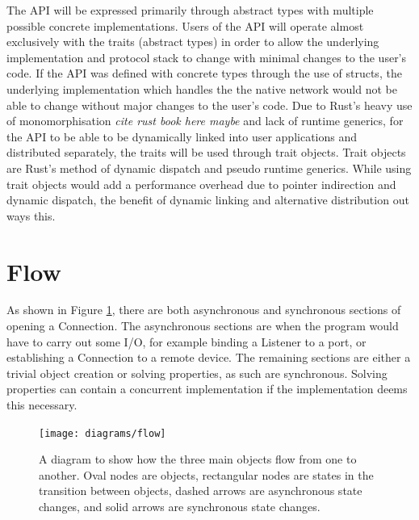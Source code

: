 \documentclass{l4proj}
\begin{document}
The API will be expressed primarily through abstract types with multiple possible concrete implementations.
Users of the API will operate almost exclusively with the traits (abstract types) in order to allow the underlying
implementation and protocol stack to change with minimal changes to the user's code.
If the API was defined with concrete types through the use of structs, the underlying implementation which handles the
the native network would not be able to change without major changes to the user's code.
Due to Rust's heavy use of monomorphisation \emph{cite rust book here maybe} and lack of runtime generics, for the API
to be able to be dynamically linked into user applications and distributed separately, the traits will be used through
trait objects.
Trait objects are Rust's method of dynamic dispatch and pseudo runtime generics.
While using trait objects would add a performance overhead due to pointer indirection and dynamic dispatch, the benefit
of dynamic linking and alternative distribution out ways this.

\section{Flow}
As shown in Figure \ref{fig:flow}, there are both asynchronous and synchronous sections of opening a Connection.
The asynchronous sections are when the program would have to carry out some I/O, for example binding a Listener to a
port, or establishing a Connection to a remote device.
The remaining sections are either a trivial object creation or solving properties, as such are synchronous.
Solving properties can contain a concurrent implementation if the implementation deems this necessary.

\begin{figure}[h]
\centering
\texttt{[image: diagrams/flow]}
\caption{A diagram to show how the three main objects flow from one to another.
Oval nodes are objects, rectangular nodes are states in the transition between objects, dashed arrows are
asynchronous state changes, and solid arrows are synchronous state changes.}
\label{fig:flow}
\end{figure}
\end{document}
